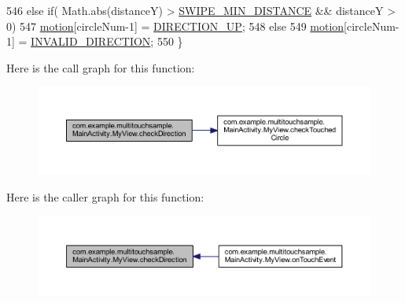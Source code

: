 \begin{DoxyCode}
546             \textcolor{keywordflow}{else} \textcolor{keywordflow}{if}( Math.abs(distanceY) > \hyperlink{classcom_1_1example_1_1multitouchsample_1_1_main_activity_1_1_my_view_a677194aa1ca850fc0e716d725f691ba1}{SWIPE\_MIN\_DISTANCE} && distanceY > 0)
547                 \hyperlink{classcom_1_1example_1_1multitouchsample_1_1_main_activity_1_1_my_view_a3e8186596771c2fae1397b496be41230}{motion}[circleNum-1] = \hyperlink{classcom_1_1example_1_1multitouchsample_1_1_main_activity_1_1_my_view_a43c4159b9b295cfea731211ac614fc0b}{DIRECTION\_UP};
548             \textcolor{keywordflow}{else}
549                 \hyperlink{classcom_1_1example_1_1multitouchsample_1_1_main_activity_1_1_my_view_a3e8186596771c2fae1397b496be41230}{motion}[circleNum-1] = \hyperlink{classcom_1_1example_1_1multitouchsample_1_1_main_activity_1_1_my_view_a1b17ab3dd378a4846a8de05a58fce3db}{INVALID\_DIRECTION};
550         \}
\end{DoxyCode}


Here is the call graph for this function\+:
\nopagebreak
\begin{figure}[H]
\begin{center}
\leavevmode
\includegraphics[width=350pt]{classcom_1_1example_1_1multitouchsample_1_1_main_activity_1_1_my_view_a6fbf678025aa07a8024eddeb5431b30c_cgraph}
\end{center}
\end{figure}




Here is the caller graph for this function\+:
\nopagebreak
\begin{figure}[H]
\begin{center}
\leavevmode
\includegraphics[width=350pt]{classcom_1_1example_1_1multitouchsample_1_1_main_activity_1_1_my_view_a6fbf678025aa07a8024eddeb5431b30c_icgraph}
\end{center}
\end{figure}


